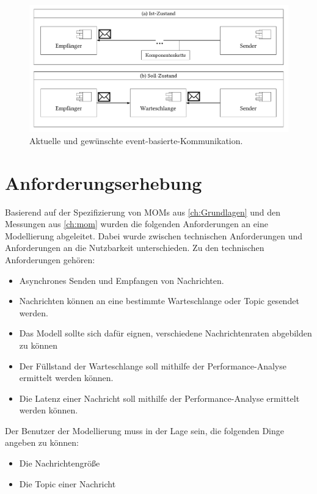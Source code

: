 \begin{figure}
\center
  \includegraphics[width=1\textwidth]{images/modelling/modelingIstSoll.pdf}
  \caption{Aktuelle und gewünschte event-basierte-Kommunikation.}
  \label{img:oldEventBased}
\end{figure}


\section{Anforderungserhebung}
\label{sec:anforderungserhebung}
Basierend auf der Spezifizierung von MOMs aus \autoref{ch:Grundlagen} und den Messungen aus \autoref{ch:mom} wurden die folgenden Anforderungen an eine Modellierung abgeleitet. Dabei wurde zwischen technischen Anforderungen und Anforderungen an die Nutzbarkeit unterschieden. 
Zu den technischen Anforderungen gehören:
\begin{itemize}
    \item Asynchrones Senden und Empfangen von Nachrichten.
    \item Nachrichten können an eine bestimmte Warteschlange oder Topic gesendet werden.
    \item Das Modell sollte sich dafür eignen, verschiedene Nachrichtenraten abgebilden zu können
    \item Der Füllstand der Warteschlange soll mithilfe der Performance-Analyse ermittelt werden können.
    \item Die Latenz einer Nachricht soll mithilfe der Performance-Analyse ermittelt werden können.
\end{itemize}
Der Benutzer der Modellierung muss in der Lage sein, die folgenden Dinge angeben zu können:
\begin{itemize}
    \item Die Nachrichtengröße
    \item Die Topic einer Nachricht
\end{itemize}

